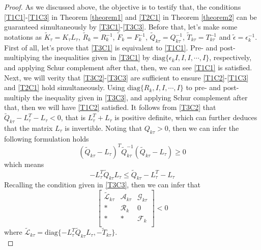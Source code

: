 \documentclass[conference]{IEEEtran}
\begin{document}
\begin{proof}
	As we discussed above, the objective is to testify that, the conditions \eqref{T1C1}-\eqref{T1C3} in Theorem \ref{theorem1} and \eqref{T2C1} in Theorem \ref{theorem2}  can be guaranteed simultaneously by \eqref{T3C1}-\eqref{T3C3}. Before that, let's make some notations as $\tilde{K}_{\tau }=K_{\tau }L_{\tau }$, $\tilde{R}_{k}=R^{-1}_{k}$, $\tilde{F}_{k}=F^{-1}_{k}$, $\tilde{Q}_{k\tau }=Q^{-1}_{k\tau }$, $\tilde{T}_{k\tau }=T^{-1}_{k\tau }$ and  $\tilde{\epsilon}=\epsilon^{-1}_{k}$. 
	First of all, let's prove that \eqref{T3C1} is equivalent to \eqref{T1C1}. Pre- and post- multiplying the inequalities given in \eqref{T3C1} by $\mathrm{diag}\{\epsilon_{k}I, I,I,\cdots,I \}$, respectively, and applying  Schur complement after that, then, we can see \eqref{T1C1} is satisfied.  
	Next, we will verity that \eqref{T3C2}-\eqref{T3C3} are sufficient  to ensure \eqref{T1C2}-\eqref{T1C3} and \eqref{T2C1} hold simultaneously.  Using $\mathrm{diag}\{R_{k}, I ,I,\cdots, I \}$  to pre- and post-multiply the inequality given in \eqref{T3C3}, and applying Schur complement after that, then we will have \eqref{T1C2} satisfied.  
	It follows from  \eqref{T3C2} that $\tilde{Q}_{k\tau}-L^{T}_{\tau }-L_{\tau }<0$, that is $L^{T}_{\tau }+L_{\tau } $ is positive definite, which can further deduces that the matrix  $L_{\tau }$ is invertible. Noting that $Q_{k\tau}>0$, then we can infer the following formulation holds
	\begin{equation}
		(\tilde{Q}_{k\tau} - L_{\tau } )^{T}\tilde{Q}^{-1}_{k\tau }(\tilde{Q}_{k\tau} - L_{\tau } )\geq 0
	\end{equation}
	which means 
	\begin{equation}
		-L^{T}_{\tau }\tilde{Q}_{k\tau }L_{\tau } \leq  \tilde{Q}_{k\tau}-L^{T}_{\tau }-L_{\tau }
	\end{equation}
	Recalling the condition given in \eqref{T3C3}, then we can infer that
	 \begin{equation} \label{ls2}
	 	\begin{bmatrix}
	 	\tilde{\mathscr{L}}_{k\tau }&\mathscr{A}_{k\tau }&\mathscr{G}_{k\tau }\\
	 	*&\mathscr{R}_{k}&0\\
	 	*&*&\mathscr{F}_{k}\\
	 	\end{bmatrix}<0
	 \end{equation}
	 where $\tilde{\mathscr{L}}_{k\tau }= \mathrm{diag}\{-L^{T}_{\tau }\tilde{Q}_{k\tau }L_{\tau },  -\tilde{T}_{k\tau } \}$. \\

\end{proof}
\end{document}
